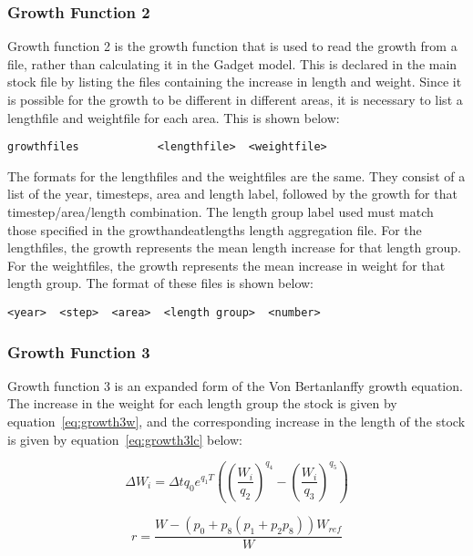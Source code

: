 \documentclass [a4paper, 10pt]{book}
\begin{document}
\subsubsection{Growth Function 2}\label{subsec:growth2}
Growth function 2 is the growth function that is used to read the growth from a file, rather than calculating it in the Gadget model.  This is declared in the main stock file by listing the files containing the increase in length and weight.  Since it is possible for the growth to be different in different areas, it is necessary to list a lengthfile and weightfile for each area.  This is shown below:

\begin{verbatim}
growthfiles            <lengthfile>  <weightfile>
\end{verbatim}

The formats for the lengthfiles and the weightfiles are the same.  They consist of a list of the year, timesteps, area  and length label, followed by the growth for that timestep/area/length combination.  The length group label used must match those specified in the growthandeatlengths length aggregation file.  For the lengthfiles, the growth represents the mean length increase for that length group.  For the weightfiles, the growth represents the mean increase in weight for that length group.  The format of these files is shown below:

\begin{verbatim}
<year>  <step>  <area>  <length group>  <number>
\end{verbatim}

\subsubsection{Growth Function 3}\label{subsec:growth3}
Growth function 3 is an expanded form of the Von Bertanlanffy growth equation.  The increase in the weight for each length group the stock is given by equation~\ref{eq:growth3w}, and the corresponding increase in the length of the stock is given by equation~\ref{eq:growth3lc} below:

\begin{equation}\label{eq:growth3w}
\Delta W_i = \Delta t q_0 e^{q_1T}\left( 
\left( \frac{W_i}{q_2} \right)^{q_4} -
\left( \frac{W_i}{q_3} \right)^{q_5} \right)
\end{equation}

\begin{equation}\label{eq:growth3la}
 r = \frac{W - \left( p_{0} + p_{8} \left( p_{1} + p_{2}p_{8} \right) \right) W_{ref}}{W}
\end{equation}
\end{document}
